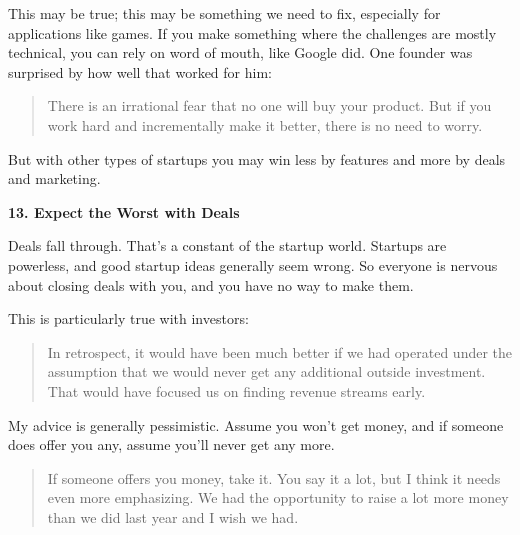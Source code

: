                   This may be true; this may be something we need to fix,
                  especially for applications like games. If you make something
                  where the challenges are mostly technical, you can rely on
                  word of mouth, like Google did. One founder was surprised by
                  how well that worked for him:
                  \begin{quote}

                    There is an irrational fear that no one will buy your
                    product. But if you work hard and incrementally make it
                    better, there is no need to worry.
                  
\end{quote}

                  But with other types of startups you may win less by features
                  and more by deals and marketing.


                  \textbf{13. Expect the Worst with Deals}

Deals fall
                  through. That's a constant of the startup world. Startups are
                  powerless, and good startup ideas generally seem wrong. So
                  everyone is nervous about closing deals with you, and you have
                  no way to make them.

This is particularly true with
                  investors:
                  \begin{quote}

                    In retrospect, it would have been much better if we had
                    operated under the assumption that we would never get any
                    additional outside investment. That would have focused us on
                    finding revenue streams early.
                  
\end{quote}

                  My advice is generally pessimistic. Assume you won't get
                  money, and if someone does offer you any, assume you'll never
                  get any more.
                  \begin{quote}

                    If someone offers you money, take it. You say it a lot, but
                    I think it needs even more emphasizing. We had the
                    opportunity to raise a lot more money than we did last year
                    and I wish we had.
                  
\end{quote}

